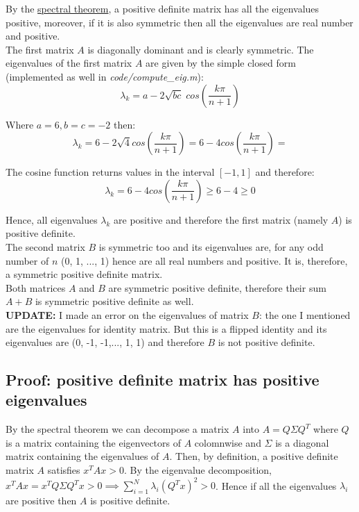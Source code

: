\documentclass[12pt]{article}
\begin{document}
By the \hyperref[sec:proof1]{spectral theorem}, a positive definite matrix has all the eigenvalues positive, moreover, if it is also symmetric then all the eigenvalues are real number and positive. \\


The first matrix $A$ is diagonally dominant and is clearly symmetric. The eigenvalues of the first matrix $A$ are given by the simple closed form (implemented as well in \textit{code/compute\_eig.m}): \\

$$\lambda_k = a - 2 \sqrt{bc} \; cos(\frac{k \pi}{n+1})$$

Where $a=6, b=c=-2$ then: \\

$$\lambda_k = 6 - 2 \sqrt{4} cos(\frac{k \pi}{n+1}) = 6 - 4 cos(\frac{k \pi}{n+1}) = $$

The cosine function returns values in the interval $[-1, 1]$ and therefore: \\

$$\lambda_k = 6 - 4 cos(\frac{k \pi}{n+1}) \geq 6 - 4 \geq 0 $$

Hence, all eigenvalues $\lambda_k$ are positive and therefore the first matrix (namely $A$) is positive definite. \\

The second matrix $B$ is symmetric too and its eigenvalues are, for any odd number of $n$ (0, 1, ..., 1)  hence are all real numbers and positive. It is, therefore, a symmetric positive definite matrix. 
\\

Both matrices $A$ and $B$ are symmetric positive definite, therefore their sum $A+B$ is symmetric positive definite as well. \\

\textbf{UPDATE:} I made an error on the eigenvalues of matrix $B$: the one I mentioned are the eigenvalues for identity matrix. But this is a flipped identity and its eigenvalues are (0, -1, -1,..., 1, 1) and therefore $B$ is not positive definite. \\

\subsection*{Proof: positive definite matrix has positive eigenvalues}
\label{sec:proof1}

By the spectral theorem we can decompose a matrix $A$ into $A = Q \Sigma Q^T$ where $Q$ is a matrix containing the eigenvectors of $A$ colomnwise and $\Sigma$ is a diagonal matrix containing the eigenvalues of $A$. Then, by definition, a positive definite matrix $A$ satisfies $x^T A x > 0 $. By the eigenvalue decomposition, $x^T A x = x^T Q \Sigma Q^T x > 0 \implies \sum_{i=1}^N \lambda_i (Q^T x)^2 > 0 $. Hence if all the eigenvalues $\lambda_i$ are positive then $A$ is positive definite. \\
\end{document}
